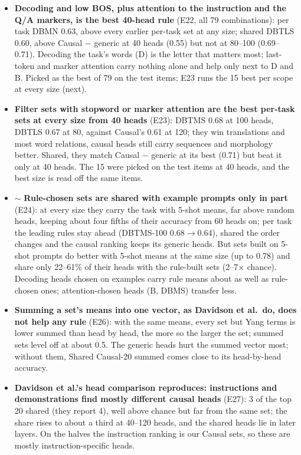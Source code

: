 \documentclass[10pt,a4paper]{article}
\newcommand{\yes}{\textcolor{green!45!black}{\ding{51}}}
\newcommand{\no}{\textcolor{red!70!black}{\ding{55}}}
\newcommand{\mixed}{\textcolor{orange!80!black}{$\sim$}}
\begin{document}
\begin{itemize}
\item \yes{} \textbf{Decoding and low BOS, plus attention to the instruction and the Q/A markers, is the best 40-head rule} (E22, all 79 combinations): per task DBMN 0.63, above every earlier per-task set at any size; shared DBTLS 0.60, above Causal $-$ generic at 40 heads (0.55) but not at 80--100 (0.69--0.71). Decoding the task's words (D) is the letter that matters most; last-token and marker attention carry nothing alone and help only next to D and B. Picked as the best of 79 on the test items; E23 runs the 15 best per scope at every size (next).
\item \yes{} \textbf{Filter sets with stopword or marker attention are the best per-task sets at every size from 40 heads} (E23): DBTMS 0.68 at 100 heads, DBTLS 0.67 at 80, against Causal's 0.61 at 120; they win translations and most word relations, causal heads still carry sequences and morphology better. Shared, they match Causal $-$ generic at its best (0.71) but beat it only at 40 heads. The 15 were picked on the test items at 40 heads, and the best size is read off the same items.
\item \mixed{} \textbf{Rule-chosen sets are shared with example prompts only in part} (E24): at every size they carry the task with 5-shot means, far above random heads, keeping about four fifths of their accuracy from 60 heads on; per task the leading rules stay ahead (DBTMS-100 0.68$\to$0.64), shared the order changes and the causal ranking keeps its generic heads. But sets built on 5-shot prompts do better with 5-shot means at the same size (up to 0.78) and share only 22--61\% of their heads with the rule-built sets (2--7$\times$ chance). Decoding heads chosen on examples carry rule means about as well as rule-chosen ones; attention-chosen heads (B, DBMS) transfer less.
\item \no{} \textbf{Summing a set's means into one vector, as Davidson et al.\ do, does not help any rule} (E26): with the same means, every set but Yang terms is lower summed than head by head, the more so the larger the set; summed sets level off at about 0.5. The generic heads hurt the summed vector most; without them, Shared Causal-20 summed comes close to its head-by-head accuracy.
\item \yes{} \textbf{Davidson et al.'s head comparison reproduces: instructions and demonstrations find mostly different causal heads} (E27): 3 of the top 20 shared (they report 4), well above chance but far from the same set; the share rises to about a third at 40--120 heads, and the shared heads lie in later layers. On the halves the instruction ranking is our Causal sets, so these are mostly instruction-specific heads.

\end{itemize}
\end{document}

